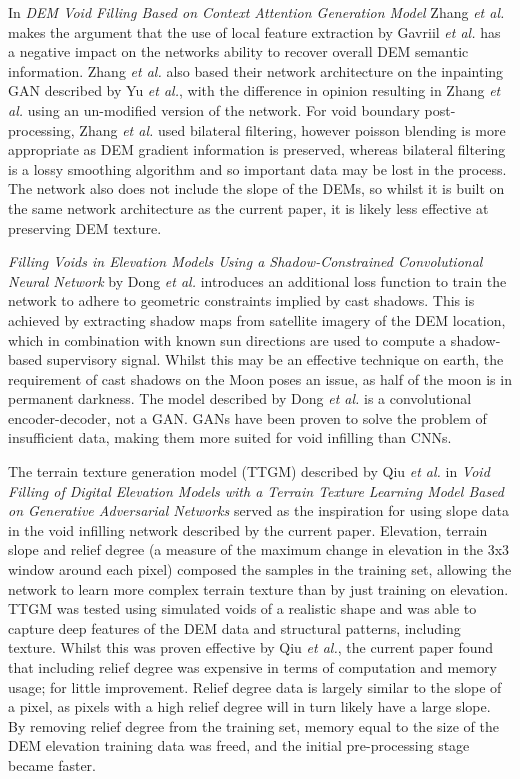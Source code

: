 \documentclass[twocolumn]{article}
\begin{document}
In \emph{DEM Void Filling Based on Context Attention Generation Model} Zhang \emph{et al.}\autocite{zhangVoidFillingBased2020} makes the argument that the use of local feature extraction by Gavriil \emph{et al.}\autocite{gavriilVoidFillingDigital2019} has a negative impact on the networks ability to recover overall DEM semantic information.
Zhang \emph{et al.} also based their network architecture on the inpainting GAN described by Yu \emph{et al.}\autocite{yuGenerativeImageInpainting2018}, with the difference in opinion resulting in Zhang \emph{et al.} using an un-modified version of the network.
For void boundary post-processing,  Zhang \emph{et al.} used bilateral filtering, however poisson blending is more appropriate as DEM gradient information is preserved, whereas bilateral filtering is a lossy smoothing algorithm and so important data may be lost in the process.
The network also does not include the slope of the DEMs, so whilst it is built on the same network architecture as the current paper, it is likely less effective at preserving DEM texture.

\emph{Filling Voids in Elevation Models Using a Shadow-Constrained Convolutional Neural Network} by Dong \emph{et al.}\autocite{dongFillingVoidsElevation2020} introduces an additional loss function to train the network to adhere to geometric constraints implied by cast shadows.
This is achieved by extracting shadow maps from satellite imagery of the DEM location, which in combination with known sun directions are used to compute a shadow-based supervisory signal.
Whilst this may be an effective technique on earth, the requirement of cast shadows on the Moon poses an issue, as half of the moon is in permanent darkness.
The model described by Dong \emph{et al.} is a convolutional encoder-decoder, not a GAN.
GANs have been proven to solve the problem of insufficient data\autocite{nandhiniabiramiDeepCNNDeep2021}, making them more suited for void infilling than CNNs.

The terrain texture generation model (TTGM) described by Qiu \emph{et al.} in \emph{Void Filling of Digital Elevation Models with a Terrain Texture Learning Model Based on Generative Adversarial Networks}\autocite{qiuVoidFillingDigital2019} served as the inspiration for using slope data in the void infilling network described by the current paper.
Elevation, terrain slope and relief degree (a measure of the maximum change in elevation in the 3x3 window around each pixel) composed the samples in the training set, allowing the network to learn more complex terrain texture than by just training on elevation.
TTGM was tested using simulated voids of a realistic shape and was able to capture deep features of the DEM data and structural patterns, including texture.
Whilst this was proven effective by Qiu \emph{et al.}, the current paper found that including relief degree was expensive in terms of computation and memory usage; for little improvement.
Relief degree data is largely similar to the slope of a pixel, as pixels with a high relief degree will in turn likely have a large slope.
By removing relief degree from the training set, memory equal to the size of the DEM elevation training data was freed, and the initial pre-processing stage became faster.
\end{document}
